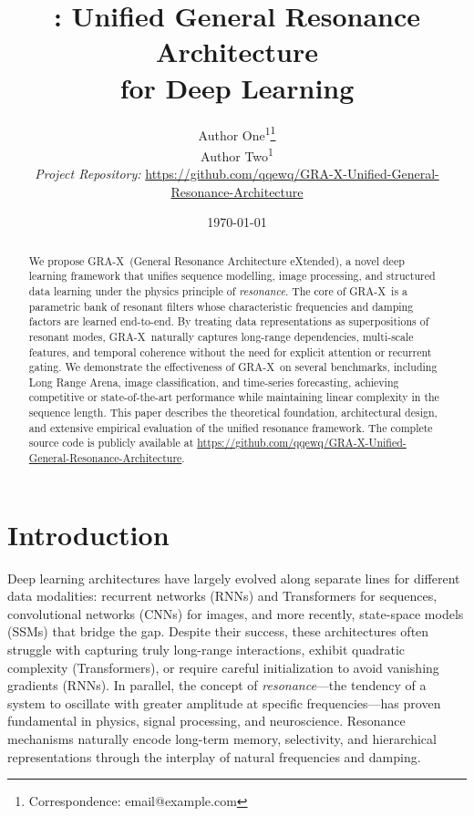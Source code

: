 \documentclass{article}
\title{\GRA: Unified General Resonance Architecture \\ for Deep Learning}
\author{
  Author One\textsuperscript{1}\thanks{Correspondence: email@example.com} \\
  Author Two\textsuperscript{1} \\
  \textit{Project Repository:} \url{https://github.com/qqewq/GRA-X-Unified-General-Resonance-Architecture}
}
\date{\today}
\newcommand{\GRA}{\textsc{GRA-X}}
\newcommand{\resonance}{\textit{resonance}}
\begin{document}
\maketitle

\begin{abstract}
We propose \GRA\ (General Resonance Architecture eXtended), a novel deep learning framework that unifies sequence modelling, image processing, and structured data learning under the physics principle of \resonance. 
The core of \GRA\ is a parametric bank of resonant filters whose characteristic frequencies and damping factors are learned end-to-end.
By treating data representations as superpositions of resonant modes, \GRA\ naturally captures long-range dependencies, multi-scale features, and temporal coherence without the need for explicit attention or recurrent gating.
We demonstrate the effectiveness of \GRA\ on several benchmarks, including Long Range Arena, image classification, and time-series forecasting, achieving competitive or state-of-the-art performance while maintaining linear complexity in the sequence length.
This paper describes the theoretical foundation, architectural design, and extensive empirical evaluation of the unified resonance framework.
The complete source code is publicly available at \url{https://github.com/qqewq/GRA-X-Unified-General-Resonance-Architecture}.
\end{abstract}

\section{Introduction}
\label{sec:intro}

Deep learning architectures have largely evolved along separate lines for different data modalities: recurrent networks (RNNs) and Transformers for sequences, convolutional networks (CNNs) for images, and more recently, state-space models (SSMs) that bridge the gap.
Despite their success, these architectures often struggle with capturing truly long-range interactions, exhibit quadratic complexity (Transformers), or require careful initialization to avoid vanishing gradients (RNNs).
In parallel, the concept of \emph{resonance}---the tendency of a system to oscillate with greater amplitude at specific frequencies---has proven fundamental in physics, signal processing, and neuroscience.
Resonance mechanisms naturally encode long-term memory, selectivity, and hierarchical representations through the interplay of natural frequencies and damping.
\end{document}
